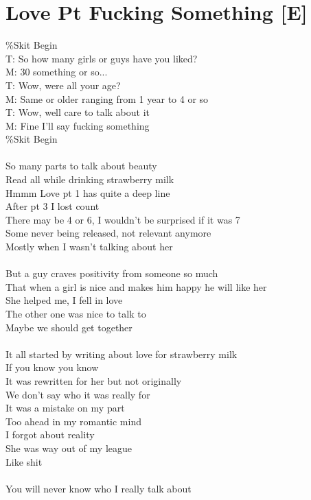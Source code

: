 \documentclass[12pt, b5paper, oneside]{book}
\begin{document}
\section{Love Pt Fucking Something [E]}
\%Skit Begin
\\T: So how many girls or guys have you liked?
\\M: 30 something or so...
\\T: Wow, were all your age?
\\M: Same or older ranging from 1 year to 4 or so
\\T: Wow, well care to talk about it
\\M: Fine I'll say fucking something
\\\%Skit Begin
%
\\\\So many parts to talk about beauty
\\Read all while drinking strawberry milk
\\Hmmm Love pt 1 has quite a deep line
\\After pt 3 I lost count
\\There may be 4 or 6, I wouldn't be surprised if it was 7
\\Some never being released, not relevant anymore
\\Mostly when I wasn't talking about her
%
\\\\But a guy craves positivity from someone so much
\\That when a girl is nice and makes him happy he will like her
\\She helped me, I fell in love
\\The other one was nice to talk to
\\Maybe we should get together
%
\\\\It all started by writing about love for strawberry milk
\\If you know you know
\\It was rewritten for her but not originally
\\We don't say who it was really for
\\It was a mistake on my part
\\Too ahead in my romantic mind
\\I forgot about reality
\\She was way out of my league
\\Like shit
%
\\\\You will never know who I really talk about
\end{document}
